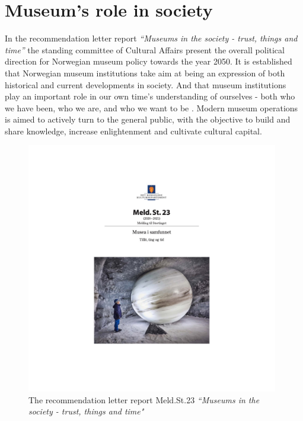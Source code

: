 \section{Museum's role in society}
In the recommendation letter report \emph{“Museums in the society - trust, things and time”} the standing committee of Cultural Affairs present the overall political direction for Norwegian museum policy towards the year 2050. It is established that Norwegian museum institutions take aim at being an expression of both historical and current developments in society. And that museum institutions play an important role in our own time’s understanding of ourselves - both who we have been, who we are, and who we want to be \autocite[p. 7]{melding23}. Modern museum operations is aimed to actively turn to the general public, with the objective to build and share knowledge, increase enlightenment and cultivate cultural capital.

\begin{figure}[H]
\includegraphics[width=11cm]{pictures/stortingsmelding.jpg}
\caption{The recommendation letter report Meld.St.23 \emph{“Museums in the society - trust, things and time"}}
\centering 
\end{figure}


